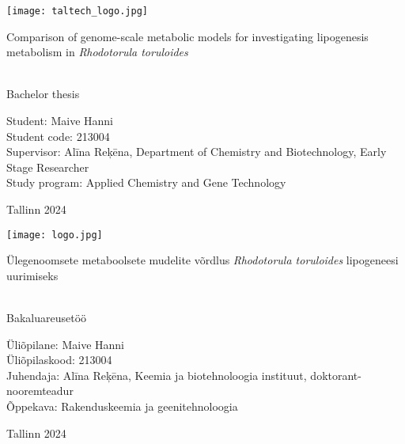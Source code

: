 \documentclass[a4paper, 11pt]{report}
\begin{document}
\begin{titlepage}
    \texttt{[image: taltech\_logo.jpg]}

    \begin{center}
        \vspace{35mm}
        \begin{LARGE}
            Comparison of genome-scale metabolic models for investigating 
            lipogenesis metabolism in \textit{Rhodotorula toruloides}
        \end{LARGE} \\
             Bachelor thesis

        \vspace{30mm}
        \hfill
        \parbox{50mm}{
            \flushleft
            Student: Maive Hanni \\
            Student code: 213004 \\
            Supervisor: Alīna Reķēna, 
            Department of Chemistry and Biotechnology, %
            Early Stage Researcher \\  %
            Study program: Applied Chemistry and Gene Technology
            }

            


        \vfill
        Tallinn 2024
    \end{center}
\end{titlepage}

\begin{titlepage}
    \texttt{[image: logo.jpg]}

    \begin{center}
        \vspace{35mm}
        \begin{LARGE}
            Ülegenoomsete metaboolsete mudelite võrdlus \textit{Rhodotorula toruloides} lipogeneesi uurimiseks
        \end{LARGE} \\
            Bakaluareusetöö

        \vspace{30mm}
        \hfill
        \parbox{50mm}{
            \flushleft
            Üliõpilane: Maive Hanni \\
            Üliõpilaskood: 213004 \\
            Juhendaja: Alīna Reķēna,
            Keemia ja biotehnoloogia instituut, %
            doktorant-nooremteadur \\ %
            Õppekava: Rakenduskeemia ja geenitehnoloogia
            }

        \vfill
        Tallinn 2024
    \end{center}
\end{titlepage}
\end{document}
